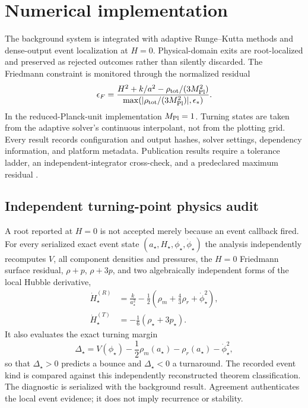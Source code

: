 \section{Numerical implementation}
The background system is integrated with adaptive Runge--Kutta methods and dense-output event localization at $H=0$. Physical-domain exits are root-localized and preserved as rejected outcomes rather than silently discarded. The Friedmann constraint is monitored through the normalized residual
\begin{equation}
\epsilon_F=\frac{H^2+k/a^2-\rho_{\rm tot}/(3M_{\mathrm{Pl}}^2)}{\max(|\rho_{\rm tot}/(3M_{\mathrm{Pl}}^2)|,\epsilon_*)}.
\end{equation}
In the reduced-Planck-unit implementation $M_{\mathrm{Pl}}=1$. Turning states are taken from the adaptive solver's continuous interpolant, not from the plotting grid. Every result records configuration and output hashes, solver settings, dependency information, and platform metadata. Publication results require a tolerance ladder, an independent-integrator cross-check, and a predeclared maximum residual \cite{wilkinson2016,barker2022}.

\subsection{Independent turning-point physics audit}
A root reported at $H=0$ is not accepted merely because an event callback fired. For every serialized exact event state $(a_\star,H_\star,\phi_\star,\dot\phi_\star)$ the analysis independently recomputes $V$, all component densities and pressures, the $H=0$ Friedmann surface residual, $\rho+p$, $\rho+3p$, and two algebraically independent forms of the local Hubble derivative,
\begin{align}
\dot H_\star^{(R)}&=\frac{k}{a_\star^2}-\frac12\left(\rho_m+\frac43\rho_r+\dot\phi_\star^2\right),\\
\dot H_\star^{(T)}&=-\frac16(\rho_\star+3p_\star).
\end{align}
It also evaluates the exact turning margin
\begin{equation}
\Delta_\star=V(\phi_\star)-\frac12\rho_m(a_\star)-\rho_r(a_\star)-\dot\phi_\star^2,
\end{equation}
so that $\Delta_\star>0$ predicts a bounce and $\Delta_\star<0$ a turnaround. The recorded event kind is compared against this independently reconstructed theorem classification. The diagnostic is serialized with the background result. Agreement authenticates the local event evidence; it does not imply recurrence or stability.

